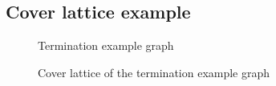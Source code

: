 \subsection{Cover lattice example}


\begin{figure}
    \centering
    
    \caption{Termination example graph}
    \label{fig:termination-example-graph}
\end{figure}

\begin{figure}
    \centering
    
    \caption{Cover lattice of the termination example graph}
    \label{fig:termination-example-cover-lattice}
\end{figure}